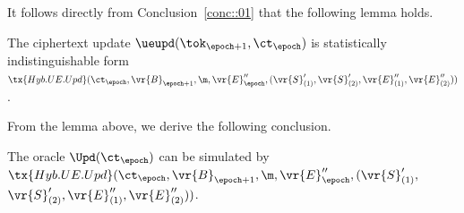 \documentclass{fundam}
\begin{document}

\vspace{1cm}

\noindent It follows directly from Conclusion~\ref{conc::01} that the following lemma holds.
\begin{lemma}
	The ciphertext update  $\ueupd( \tok_{\epoch+1}, \ct_{\epoch})$ is statistically indistinguishable form \\$\tx{Hyb.UE.Upd}(\ct_{\epoch}, \vr{B}_{\epoch+1},\m, \vr{E}_{\epoch}'', (\vr{S}_{(1)}', \vr{S}_{(2)}', \vr{E}_{(1)}'', \vr{E}_{(2)}''))$.	
\end{lemma}	


\noindent From the lemma above, we derive the following conclusion.
\begin{concl}\label{conc::02}
	The oracle $\Upd(\ct_{\epoch})$ can be simulated by $\tx{Hyb.UE.Upd}(\ct_{\epoch}, \vr{B}_{\epoch+1},\m, \vr{E}_{\epoch}'', (\vr{S}_{(1)}',$ $\vr{S}_{(2)}', \vr{E}_{(1)}'', \vr{E}_{(2)}''))$.	
\end{concl}
\end{document}
